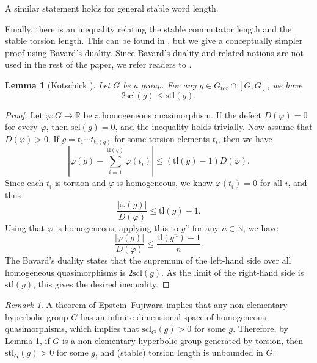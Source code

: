 \documentclass{amsart}
\newtheorem{lemma}[theorem]{Lemma}
\theoremstyle{definition}
\newcommand{\rr}{\mathbb{R}}
\newcommand{\nn}{\mathbb{N}}
\newcommand{\zz}{\mathbb{Z}}
\numberwithin{equation}{section}
\theoremstyle{theorem}
\theoremstyle{remark}
\newtheorem{remark}[theorem]{Remark}
\def\scl{\mathrm{scl}}
\def\tl{\mathrm{tl}}
\def\stl{\mathrm{stl}}
\def\Gt{G_{tor}}
\begin{document}
	A similar statement holds for general stable word length. 
	
	
	Finally, there is an inequality relating the stable commutator length and the stable torsion length. This can be found in \cite{Kotschick}, but we give a conceptually simpler proof using Bavard's duality. Since Bavard's duality and related notions are not used in the rest of the paper, we refer readers to \cite[Chapter 2]{Cal:sclbook}.
	
	\begin{lemma}[Kotschick \cite{Kotschick}] \label{lemma: scl inequality}
		Let $G$ be a group. For any $g\in \Gt \cap [G,G]$, we have
		$$2 \scl(g) \leq \stl(g).$$
	\end{lemma}
	\begin{proof}
		Let $\varphi:G\to \rr$ be a homogeneous quasimorphism. If the defect $D(\varphi)=0$ for every $\varphi$, then $\scl(g)=0$, and the inequality holds trivially. 
		Now assume that $D(\varphi)>0$. If $g=t_1\cdots t_{\tl(g)}$ for some torsion elements $t_i$, then 
		we have 
		$$\left|\varphi(g)-\sum_{i=1}^{\tl(g)}\varphi(t_i)\right|\leq (\tl(g)-1)D(\varphi).$$
		Since each $t_i$ is torsion and $\varphi$ is homogeneous, we know $\varphi(t_i)=0$ for all $i$, and thus
		$$\frac{|\varphi(g)|}{D(\varphi)}\leq \tl(g)-1.$$
		Using that $\varphi$ is homogeneous, applying this to $g^n$ for any $n\in \nn$, we have 
		$$\frac{|\varphi(g)|}{D(\varphi)}\leq \frac{\tl(g^n)-1}{n}.	$$
		The Bavard's duality states that the supremum of the left-hand side over all homogeneous quasimorphisms is $2\scl(g)$.
		As the limit of the right-hand side is $\stl(g)$, this gives the desired inequality.
	\end{proof}
	
	\begin{remark} \label{remark: hyperbolic}
	A theorem of Epstein--Fujiwara \cite{hypbddcohom} implies that any non-elementary hyperbolic group $G$ has an infinite dimensional space of homogeneous quasimorphisms, which implies that $\scl_G(g)>0$ for some $g$. Therefore, by Lemma \ref{lemma: scl inequality}, if $G$ is a non-elementary hyperbolic group generated by torsion, then $\stl_G(g)>0$ for some $g$, and (stable) torsion length is unbounded in $G$.
	
	\end{remark}
	
\end{document}
